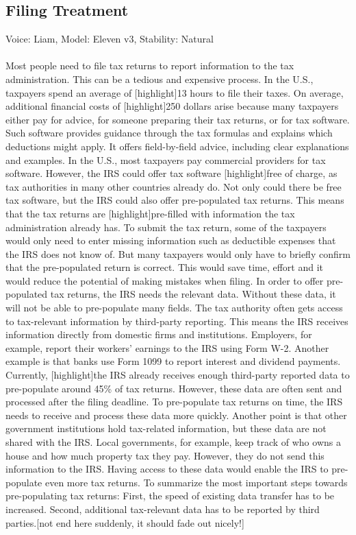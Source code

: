 \documentclass[11pt]{article}
\begin{document}
\subsection{Filing Treatment}
Voice: Liam,
Model: Eleven v3,
Stability: Natural\\\\
Most people need to file tax returns to report information to the tax administration. This can be a tedious and expensive process. In the U.S., taxpayers spend an average of [highlight]13 hours to file their taxes. On average, additional financial costs of [highlight]250 dollars arise because many taxpayers either pay for advice, for someone preparing their tax returns, or for tax software. Such software provides guidance through the tax formulas and explains which deductions might apply. It offers field-by-field advice, including clear explanations and examples. 
In the U.S., most taxpayers pay commercial providers for tax software. However, the IRS could offer tax software [highlight]free of charge, as tax authorities in many other countries already do. Not only could there be free tax software, but the IRS could also offer pre-populated tax returns. This means that the tax returns are [highlight]pre-filled with information the tax administration already has. To submit the tax return, some of the taxpayers would only need to enter missing information such as deductible expenses that the IRS does not know of. But many taxpayers would only have to briefly confirm that the pre-populated return is correct. This would save time, effort and it would reduce the potential of making mistakes when filing.
In order to offer pre-populated tax returns, the IRS needs the relevant data. Without these data, it will not be able to pre-populate many fields. 
The tax authority often gets access to tax-relevant information by third-party reporting. This means the IRS receives information directly from domestic firms and institutions. Employers, for example, report their workers’ earnings to the IRS using Form W-2.  Another example is that banks use Form 1099 to report interest and dividend payments. 
Currently, [highlight]the IRS already receives enough third-party reported data to pre-populate around 45\% of tax returns. However, these data are often sent and processed after the filing deadline. To pre-populate tax returns on time, the IRS needs to receive and process these data more quickly. Another point is that other government institutions hold tax-related information, but these data are not shared with the IRS. Local governments, for example, keep track of who owns a house and how much property tax they pay. However, they do not send this information to the IRS. Having access to these data would enable the IRS to pre-populate even more tax returns. To summarize the most important steps towards pre-populating tax returns: 
First, the speed of existing data transfer has to be increased. Second, additional tax-relevant data has to be reported by third parties.[not end here suddenly, it should fade out nicely!]
\end{document}
